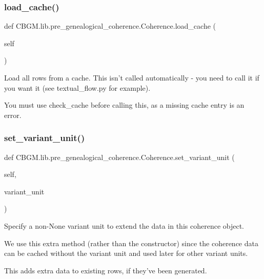 \subsubsection{\texorpdfstring{load\+\_\+cache()}{load\_cache()}}
{\footnotesize\ttfamily def C\+B\+G\+M.\+lib.\+pre\+\_\+genealogical\+\_\+coherence.\+Coherence.\+load\+\_\+cache (\begin{DoxyParamCaption}\item[{}]{self }\end{DoxyParamCaption})}

\begin{DoxyVerb}Load all rows from a cache. This isn't called automatically - you
need to call it if you want it (see textual_flow.py for example).

You must use check_cache before calling this, as a missing cache entry
is an error.
\end{DoxyVerb}
 \mbox{\label{classCBGM_1_1lib_1_1pre__genealogical__coherence_1_1Coherence_af601453fe8d3cd09f1aff40cab2eb337}} 
\subsubsection{\texorpdfstring{set\+\_\+variant\+\_\+unit()}{set\_variant\_unit()}}
{\footnotesize\ttfamily def C\+B\+G\+M.\+lib.\+pre\+\_\+genealogical\+\_\+coherence.\+Coherence.\+set\+\_\+variant\+\_\+unit (\begin{DoxyParamCaption}\item[{}]{self,  }\item[{}]{variant\+\_\+unit }\end{DoxyParamCaption})}

\begin{DoxyVerb}Specify a non-None variant unit to extend the data in this coherence object.

We use this extra method (rather than the constructor) since the coherence data can be cached without the
variant unit and used later for other variant units.

This adds extra data to existing rows, if they've been generated.
\end{DoxyVerb}
 \mbox{\label{classCBGM_1_1lib_1_1pre__genealogical__coherence_1_1Coherence_a28dac83d056599fdbd2993cbd99aecdc}} 
